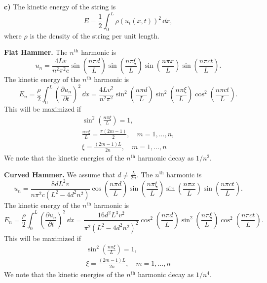 {\begin{Solution}
  \textbf{c)}
  The kinetic energy of the string is
  \[
  E = \frac{1}{2} \int_0^L \rho \left( u_t(x, t) \right)^2 \,\dd x,
  \]
  where $\rho$ is the density of the string per unit length.  

  \textbf{Flat Hammer.}
  The $n^{\mathrm{th}}$ harmonic is
  \[
  u_n = \frac{4 L v}{n^2 \pi^2 c} 
  \sin\left( \frac{n \pi d}{L} \right)
  \sin\left( \frac{n \pi \xi}{L} \right)
  \sin\left( \frac{n \pi x}{L} \right)
  \sin\left( \frac{n \pi c t}{L} \right).
  \]
  The kinetic energy of the $n^{\mathrm{th}}$ harmonic is
  \[
  E_n = \frac{\rho}{2} \int_0^L \left( \frac{\partial u_n}{\partial t} \right)^2 \,\dd x
  = \frac{4 L v^2}{n^2 \pi^2} 
  \sin^2\left( \frac{n \pi d}{L} \right)
  \sin^2\left( \frac{n \pi \xi}{L} \right)
  \cos^2 \left( \frac{n \pi c t}{L} \right).
  \]
  This will be maximized if
  \begin{gather*}
    \sin^2 \left( \frac{ n \pi \xi}{L} \right) = 1, \\
    \frac{n \pi \xi}{L} = \frac{\pi(2 m - 1)}{2}, \quad m = 1, \ldots, n, \\
    \boxed{
      \xi = \frac{(2 m - 1)L}{2 n}, \quad m = 1, \ldots, n
      }
  \end{gather*}
  We note that the kinetic energies of the $n^{\mathrm{th}}$ harmonic decay
  as $1/n^2$.

  \textbf{Curved Hammer.}
  We assume that $d \neq \frac{L}{2n}$.  The $n^{\mathrm{th}}$ harmonic is
  \[
  u_n = \frac{8 d L^2 v}{n \pi^2 c (L^2 - 4 d^2 n^2)}
  \cos\left( \frac{n \pi d}{L} \right)
  \sin\left( \frac{n \pi \xi}{L} \right)
  \sin\left( \frac{n \pi x}{L} \right)
  \sin\left( \frac{n \pi c t}{L} \right).
  \]
  The kinetic energy of the $n^{\mathrm{th}}$ harmonic is
  \[
  E_n = \frac{\rho}{2} \int_0^L \left( \frac{\partial u_n}{\partial t} \right)^2 \,\dd x
  = \frac{16 d^2 L^3 v^2}{ \pi^2 (L^2 - 4 d^2 n^2)^2 }
  \cos^2\left( \frac{n \pi d}{L} \right)
  \sin^2\left( \frac{n \pi \xi}{L} \right)
  \cos^2 \left( \frac{n \pi c t}{L} \right).
  \]
  This will be maximized if
  \begin{gather*}
    \sin^2 \left( \frac{ n \pi \xi}{L} \right) = 1, \\
    \boxed{
      \xi = \frac{(2 m - 1)L}{2 n}, \quad m = 1, \ldots, n
      }
  \end{gather*}
  We note that the kinetic energies of the $n^{\mathrm{th}}$ harmonic decay
  as $1/n^4$.
\end{Solution}
















}
